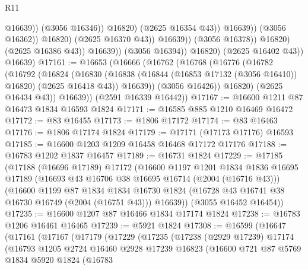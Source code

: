 \begin{lexlean}{R11}
\begin{coremodule}
                                              @16639))
                                          (@3056 @16346))
                                        @16820)
                                      (@2625 @16354 @43))
                                    @16639))
                                (@3056 @16362))
                              @16820)
                            (@2625 @16370 @43))
                          @16639))
                      (@3056 @16378))
                    @16820)
                  (@2625 @16386 @43))
                @16639))
            (@3056 @16394))
          @16820)
        (@2625 @16402 @43))
      @16639)
@17161 := @16653
    (@16666
      (@16762
        (@16768
          (@16776
            (@16782
              (@16792
                (@16824
                  (@16830
                    (@16838 (@16844 (@16853 @17132 (@3056 @16410)) @16820) (@2625 @16418 @43))
                    @16639))
                (@3056 @16426))
              @16820)
            (@2625 @16434 @43))
          @16639))
      (@2591 @16339 @16442))
@17167 := @16600 @1211 @87 @16473 @1834 @16593 @1824
@17171 := @16585 @885 @1210 @16469 @16472
@17172 := @83 @16455
@17173 := @1806 @17172
@17174 := @83 @16463
@17176 := @1806 @17174 @1824
@17179 := @17171 (@17173 @17176) @16593
@17185 := @16600 @1203 @1209 @16458 @16468 @17172 @17176
@17188 := @16783 @1202 @1837 @16457
@17189 := @16731 @1824
@17229 := @17185
    (@17188
      (@16696 @17189)
      @17172
      (@16600
        @1197
        @1201
        @1834
        @1836
        @16695
        @17189
        (@16693 @43 @16706 @38 @16695 @16714 (@2004 (@16716 @43)))
        (@16600
          @1199
          @87
          @1834
          @1834
          @16730
          @1824
          (@16728 @43 @16741 @38 @16730 @16749 (@2004 (@16751 @43)))
          @16639))
      (@3055 @16452 @16454))
@17235 := @16600 @1207 @87 @16466 @1834 @17174 @1824
@17238 := @16783 @1206 @16461 @16465
@17239 := @5921 @1824
@17308 := @16599
    (@16647
      (@17161
        (@17167
          (@17179
            (@17229
              (@17235
                (@17238
                  (@2929 @17239)
                  @17174
                  (@16793
                    @1205
                    @2724
                    @16460
                    @2928
                    @17239
                    @16823
                    (@16600
                      @721
                      @87
                      @5769
                      @1834
                      @5920
                      @1824
                      (@16783

\end{coremodule}
\end{lexlean}
